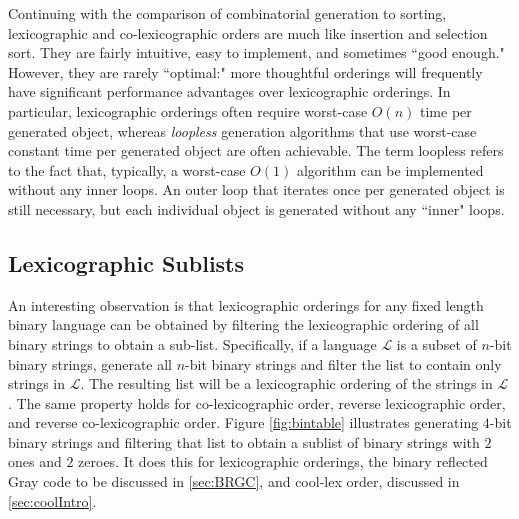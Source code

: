 Continuing with the comparison of combinatorial generation to sorting, lexicographic and co-lexicographic orders are much like insertion and selection sort.  They are fairly intuitive, easy to implement, and sometimes ``good enough."  However, they are rarely ``optimal:" more thoughtful orderings will frequently have significant performance advantages over lexicographic orderings. In particular, lexicographic orderings often require worst-case $O(n)$ time per generated object, whereas \emph{loopless} generation algorithms that use worst-case constant time per generated object are often achievable. The term loopless refers to the fact that, typically, a worst-case $O(1)$ algorithm can be implemented without any inner loops.  An outer loop that iterates once per generated object is still necessary, but each individual object is generated without any ``inner" loops.

 \subsection{Lexicographic Sublists}
 An interesting observation is that lexicographic orderings for any fixed length binary language can be obtained by filtering the lexicographic ordering of all binary strings to obtain a sub-list. Specifically, if a language $\mathcal{L}$ is a subset of $n$-bit binary strings, generate all $n$-bit binary strings and filter the list to contain only strings in $\mathcal{L}$.  The resulting list will be a lexicographic ordering of the strings in $\mathcal{L}$.  The same property holds for co-lexicographic order, reverse lexicographic order, and reverse co-lexicographic order.  Figure \ref{fig:bintable} illustrates generating $4$-bit binary strings and filtering that list to obtain a sublist of binary strings with $2$ ones and $2$ zeroes.  It does this for lexicographic orderings, the binary reflected Gray code to be discussed in \ref{sec:BRGC}, and cool-lex order, discussed in \ref{sec:coolIntro}.


